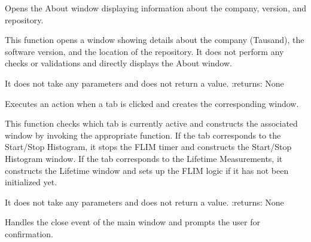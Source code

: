\documentclass[letterpaper,10pt,english]{sphinxmanual}
\begin{document}
\begin{fulllineitems}

\begin{fulllineitems}
\label{\detokenize{main:main.MainWindow.about_settings}}
\pysigstartsignatures
{}
\pysigstopsignatures
\sphinxAtStartPar
Opens the About window displaying information about the company, version, and repository.

\sphinxAtStartPar
This function opens a window showing details about the company (Tausand), the software version, 
and the location of the repository. It does not perform any checks or validations and directly 
displays the About window.

\sphinxAtStartPar
It does not take any parameters and does not return a value.
:returns: None

\end{fulllineitems}


\begin{fulllineitems}
\label{\detokenize{main:main.MainWindow.clicked_tabs}}
\pysigstartsignatures
{}
\pysigstopsignatures
\sphinxAtStartPar
Executes an action when a tab is clicked and creates the corresponding window.

\sphinxAtStartPar
This function checks which tab is currently active and constructs the associated window 
by invoking the appropriate function. If the tab corresponds to the Start/Stop Histogram, 
it stops the FLIM timer and constructs the Start/Stop Histogram window. If the tab corresponds 
to the Lifetime Measurements, it constructs the Lifetime window and sets up the FLIM logic if it 
has not been initialized yet.

\sphinxAtStartPar
It does not take any parameters and does not return a value.
:returns: None

\end{fulllineitems}


\begin{fulllineitems}
\label{\detokenize{main:main.MainWindow.closeEvent}}
\pysigstartsignatures
{}
\pysigstopsignatures
\sphinxAtStartPar
Handles the close event of the main window and prompts the user for confirmation.


\end{fulllineitems}
\end{fulllineitems}
\end{document}
